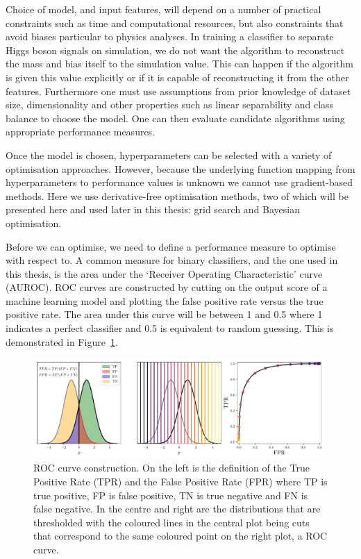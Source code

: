 Choice of model, and input features, will depend on a number of practical constraints such as time and computational resources, but also constraints that avoid biases particular to physics analyses. 
In training a classifier to separate Higgs boson signals on simulation, we do not want the algorithm to reconstruct the mass and bias itself to the simulation value. This can happen if the algorithm is given this value explicitly or if it is capable of reconstructing it from the other features.  
Furthermore one must use assumptions from prior knowledge of dataset size, dimensionality and other properties such as linear separability and class balance to choose the model. One can then evaluate candidate algorithms using appropriate performance measures. 


Once the model is chosen, hyperparameters can be selected with a variety of optimisation approaches. However, because the underlying function mapping from hyperparameters to performance values is unknown we cannot use gradient-based methods. Here we use derivative-free optimisation methods, two of which will be presented here and used later in this thesis: grid search and Bayesian optimisation. 

Before we can optimise, we need to define a performance measure to optimise with respect to. A common measure for binary classifiers, and the one used in this thesis, is the area under the `Receiver Operating Characteristic' curve (AUROC).
ROC curves are constructed by cutting on the output score of a machine learning model and plotting the false positive rate versus the true positive rate. The area under this curve will be between 1 and 0.5 where 1 indicates a perfect classifier and 0.5 is equivalent to random guessing. This is demonstrated in Figure~\ref{fig:machine_learning:ROC_curve}. 
\begin{figure}[h!]
    \begin{center}
        \includegraphics[width=0.99\textwidth]{figures/machine_learning/ROC_figure.pdf}
    \end{center}
    \caption{ROC curve construction. On the left is the definition of the True Positive Rate (TPR) and the False Positive Rate (FPR) where TP is true positive, FP is false positive, TN is true negative and FN is false negative. In the centre and right are the distributions that are thresholded with the coloured lines in the central plot being cuts that correspond to the same coloured point on the right plot, a ROC curve. }
        \label{fig:machine_learning:ROC_curve}
\end{figure}


